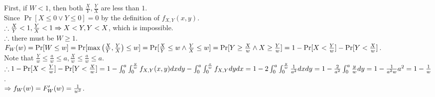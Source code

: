 \begin{pr}
First, if $W<1$, then both $\frac XY, \frac YX$ are less than $1$.\\
Since $\Pr[X\leq0\lor Y\leq0]=0$ by the definition of $f_{X, Y}(x, y)$.\\
$\so\frac XY<1, \frac YX<1\then X<Y, Y<X$, which is impossible.\\
$\so$ there must be $W\geq1$.\\
$F_W(w)=\P[W\leq w]=\P[\max\left(\frac XY, \frac YX\right)\leq w]=\P[\frac XY\leq w\land\frac YX\leq w]=\P[Y\geq\frac Xw\land X\geq\frac Yw]=1-\P[X<\frac Yw]-\P[Y<\frac Xw]$.\\
Note that $\frac Yw\leq\frac aw\leq a, \frac Xw\leq\frac aw\leq a$.\\
$\so1-\P[X<\frac Yw]-\P[Y<\frac Xw]=1-\int_0^a\int_0^{\frac yw}f_{X, Y}(x, y)dxdy-\int_0^a\int_0^{\frac xw}f_{X, Y}dydx=1-2\int_0^a\int_0^{\frac yw}\frac1{a^2}dxdy=1-\frac2{a^2}\int_0^a\frac ywdy=1-\frac1{a^2w}a^2=1-\frac1w$.\\
$\then f_W(w)=F_W'(w)=\frac1{w^2}$.
\end{pr}
